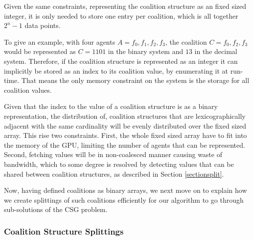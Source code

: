 \documentclass{llncs}
\begin{document}
Given the same constraints, representing the coalition structure as an fixed sized integer, it is only 
needed to store one entry per coalition, which is all together \begin{math}2^n-1\end{math} data points.

To give an example, with four agents $A = {f_0,f_1,f_2,f_3}$, the coalition $C = {f_0,f_2,f_3}$ would be represented as $C = 1101$ in the binary system and $13$ in the decimal system. Therefore, if the coalition structure is represented as an integer it can implicitly be stored as an index to its coalition value, by enumerating it at run-time. That means the only memory constraint on the system is the storage for all coalition values.

Given that the index to the value of a coalition structure is as a binary representation, the distribution of, coalition structures 
that are lexicographically adjacent with the same cardinality will be evenly distributed over the fixed sized array.
This rise two constraints. First, the whole fixed sized array have to fit into the memory of the GPU, limiting the number of agents that can be represented. Second, fetching values will be in non-coalesced manner causing waste of bandwidth, which to some degree is resolved by detecting values that can be shared between coalition structures, as described in Section \ref{sectionsplit}.


Now, having defined coalitions as binary arrays, we next move on to explain how we create splittings of such coalitions efficiently for our algorithm to go through sub-solutions of the CSG problem.
\subsubsection{Coalition Structure Splittings}

\end{document}

